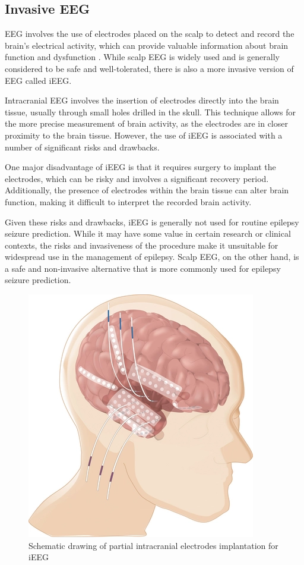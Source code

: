 \subsection{Invasive EEG}
\gls{EEG} involves the use of electrodes placed on the scalp to detect and record the brain's electrical activity, which can provide valuable information about brain function and dysfunction \cite{mercier_advances_2022}. While scalp \gls{EEG} is widely used and is generally considered to be safe and well-tolerated, there is also a more invasive version of \gls{EEG} called \gls{iEEG}.

Intracranial EEG involves the insertion of electrodes directly into the brain tissue, usually through small holes drilled in the skull. This technique allows for the more precise measurement of brain activity, as the electrodes are in closer proximity to the brain tissue. However, the use of \gls{iEEG} is associated with a number of significant risks and drawbacks.

One major disadvantage of \gls{iEEG} is that it requires surgery to implant the electrodes, which can be risky and involves a significant recovery period. Additionally, the presence of electrodes within the brain tissue can alter brain function, making it difficult to interpret the recorded brain activity.

Given these risks and drawbacks, \gls{iEEG} is generally not used for routine epilepsy seizure prediction. While it may have some value in certain research or clinical contexts, the risks and invasiveness of the procedure make it unsuitable for widespread use in the management of epilepsy. Scalp EEG, on the other hand, is a safe and non-invasive alternative that is more commonly used for epilepsy seizure prediction.

\begin{figure}[ht]
    \centering
    \includegraphics[scale=0.5]{images/Th-background/intracranialEEG.png}
    \caption{Schematic drawing of partial intracranial electrodes implantation for \gls{iEEG} \cite{surbeck_combination_2011}}
    \label{fig:intracranialEEG}
\end{figure}

